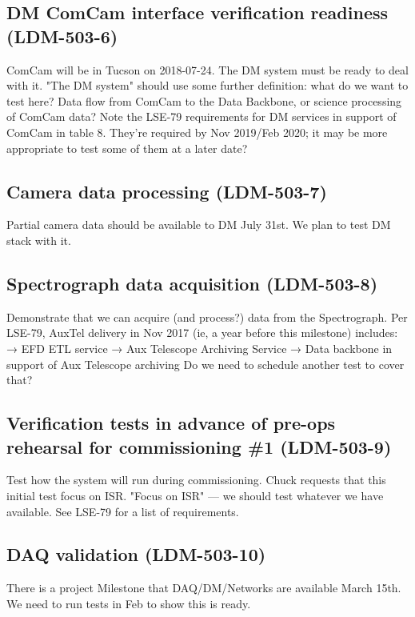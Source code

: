 \subsection{DM ComCam interface verification readiness \textbf{(LDM-503-6)}\label{LDM-503-6}}
ComCam will be in Tucson on 2018-07-24. The DM system must be ready to deal with it.
 \newline
"The DM system" should use some further definition: what do we want to test here? Data flow from ComCam to the Data Backbone, or science processing of ComCam data?
 Note the LSE-79 requirements for DM services in support of ComCam in table 8. They're required by Nov 2019/Feb 2020; it may be more appropriate to test some of them at a later date?
\subsection{Camera data processing \textbf{(LDM-503-7)}\label{LDM-503-7}}
Partial camera data should be available to DM July 31st. We plan to test DM stack with it.
 \newline

\subsection{Spectrograph data acquisition \textbf{(LDM-503-8)}\label{LDM-503-8}}
Demonstrate that we can acquire (and process?) data from the Spectrograph.
 \newline
Per LSE-79, AuxTel delivery in Nov 2017 (ie, a year before this milestone) includes: → EFD ETL service → Aux Telescope Archiving Service → Data backbone in support of Aux Telescope archiving Do we need to schedule another test to cover that?
\subsection{Verification tests in advance of pre-ops rehearsal for commissioning \#1 \textbf{(LDM-503-9)}\label{LDM-503-9}}
Test how the system will run during commissioning.
 Chuck requests that this initial test focus on ISR.
 \newline
"Focus on ISR" — we should test whatever we have available. See LSE-79 for a list of requirements.
\subsection{DAQ validation \textbf{(LDM-503-10)}\label{LDM-503-10}}
There is a project Milestone that DAQ/DM/Networks are available March 15th. We need to run tests in Feb to show this is ready.
 \newline

